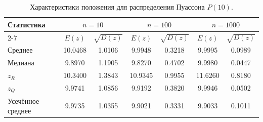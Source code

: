 \begin{table}[H]
\centering
\small
\begin{tabular}{|l|cc|cc|cc|}
\hline
\multirow{2}{*}{Статистика} & \multicolumn{2}{c|}{$n=10$} & \multicolumn{2}{c|}{$n=100$} & \multicolumn{2}{c|}{$n=1000$} \\
\cline{2-7}
 & $E(z)$ & $\sqrt{D(z)}$ & $E(z)$ & $\sqrt{D(z)}$ & $E(z)$ & $\sqrt{D(z)}$ \\
\hline
Среднее & 10.0468 & 1.0106 & 9.9948 & 0.3218 & 9.9995 & 0.0989 \\
\hline
Медиана & 9.8970 & 1.1905 & 9.8270 & 0.4702 & 9.9980 & 0.0447 \\
\hline
$z_R$ & 10.3400 & 1.3843 & 10.9345 & 0.9955 & 11.6260 & 0.8180 \\
\hline
$z_Q$ & 9.9741 & 1.0856 & 9.9192 & 0.3820 & 9.9946 & 0.0502 \\
\hline
Усечённое среднее & 9.9735 & 1.0355 & 9.9021 & 0.3331 & 9.9033 & 0.1011 \\
\hline
\end{tabular}
\caption{Характеристики положения для распределения Пуассона $P(10)$.}
\label{tab:poisson_precise}
\end{table}